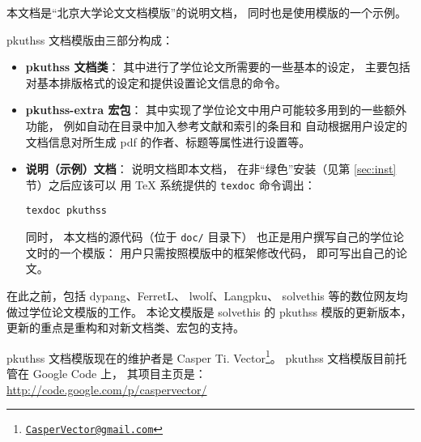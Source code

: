 %


本文档是“北京大学论文文档模版”的说明文档，
同时也是使用模版的一个示例。

pkuthss 文档模版由三部分构成：
\begin{itemize}
	\item \textbf{pkuthss 文档类}：
		其中进行了学位论文所需要的一些基本的设定，
		主要包括对基本排版格式的设定和提供设置论文信息的命令。
	\item \textbf{pkuthss-extra 宏包}：
		其中实现了学位论文中用户可能较多用到的一些额外功能，
		例如自动在目录中加入参考文献和索引的条目和%
		自动根据用户设定的文档信息对所生成 pdf 的作者、标题等属性进行设置等。
	\item \textbf{说明（示例）文档}：
		说明文档即本文档，
		在非“绿色”安装（见第 \ref{sec:inst} 节）之后应该可以%
		用 \TeX{} 系统提供的 \verb|texdoc| 命令调出：
\begin{Verbatim}[frame=single]
texdoc pkuthss
\end{Verbatim}
		同时，
		本文档的源代码（位于 \verb|doc/| 目录下）%
		也正是用户撰写自己的学位论文时的一个模版：
		用户只需按照模版中的框架修改代码，
		即可写出自己的论文。
\end{itemize}

在此之前，包括 dypang\cite{dypang}、FerretL\cite{FerretL}、%
lwolf\cite{lwolf}、Langpku\cite{Langpku}、%
solvethis\cite{solvethis} 等的数位网友均做过学位论文模版的工作。
本论文模版是 solvethis 的 pkuthss 模版的更新版本，
更新的重点是重构和对新文档类、宏包的支持。

pkuthss 文档模版现在的维护者是 Casper Ti. Vector\footnote%
{\href{mailto:CasperVector@gmail.com}{\texttt{CasperVector@gmail.com}}}。%
pkuthss 文档模版目前托管在 Google Code 上，
其项目主页是：\\
\hspace*{\parindent}\url{http://code.google.com/p/caspervector/}

